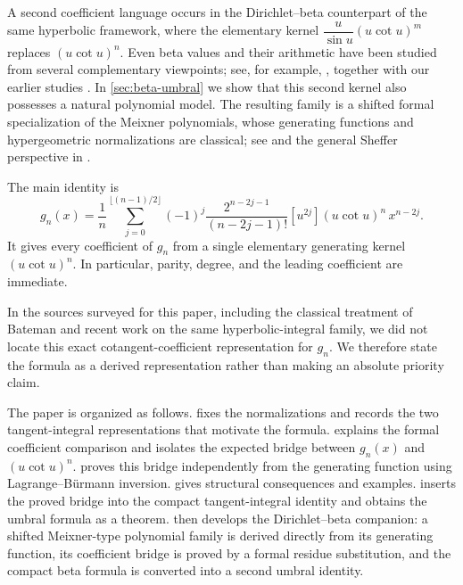 \documentclass[11pt,twoside]{article}
\numberwithin{equation}{section}
\begin{document}
A second coefficient language occurs in the Dirichlet--beta counterpart
of the same hyperbolic framework, where the elementary kernel
\(\dfrac{u}{\sin u}(u\cot u)^m\)
replaces $(u\cot u)^n$.  Even beta values and their arithmetic have been
studied from several complementary viewpoints; see, for example,
\cite{Apostol1976,WeissteinBeta,Zudilin2019,Kyrion2025}, together with
our earlier studies \cite{talla_waffo_integral_2025,
TallaWaffo2026arxiv2602.16761}.  In \cref{sec:beta-umbral}
we show that this second kernel also possesses a natural polynomial
model.  The resulting family is a shifted formal specialization of the
Meixner polynomials, whose generating functions and hypergeometric
normalizations are classical; see \cite{NIST:DLMF,KoekoekLeskySwarttouw2010}
and the general Sheffer perspective in
\cite{Sheffer1939,RotaKahanerOdlyzko1973,Roman1984}.

The main identity is
\begin{equation}
\label{eq:main-intro}
 g_n(x)
 =\frac1n
 \sum_{j=0}^{\lfloor(n-1)/2\rfloor}
 (-1)^j
 \frac{2^{n-2j-1}}{(n-2j-1)!}
 [u^{2j}](u\cot u)^n\,x^{n-2j}.
\end{equation}
It gives every coefficient of $g_n$ from a single elementary generating
kernel $(u\cot u)^n$.  In particular, parity, degree, and the leading
coefficient are immediate.

In the sources surveyed for this paper, including the classical treatment of
Bateman and recent work on the same hyperbolic-integral family, we did not
locate this exact cotangent-coefficient representation for $g_n$.  We therefore
state the formula as a derived representation rather than making an absolute
priority claim.

The paper is organized as follows.   fixes the
normalizations and records the two tangent-integral representations that
motivate the formula.   explains the formal
coefficient comparison and isolates the expected bridge between
$g_n(x)$ and $(u\cot u)^n$.   proves this bridge
independently from the generating function using Lagrange--B\"urmann
inversion.   gives structural consequences and
examples.   inserts the proved bridge into the
compact tangent-integral identity and obtains the umbral formula as a
theorem.   then develops the Dirichlet--beta
companion: a shifted Meixner-type polynomial family is derived directly
from its generating function, its coefficient bridge is proved by a
formal residue substitution, and the compact beta formula is converted
into a second umbral identity.
\end{document}
